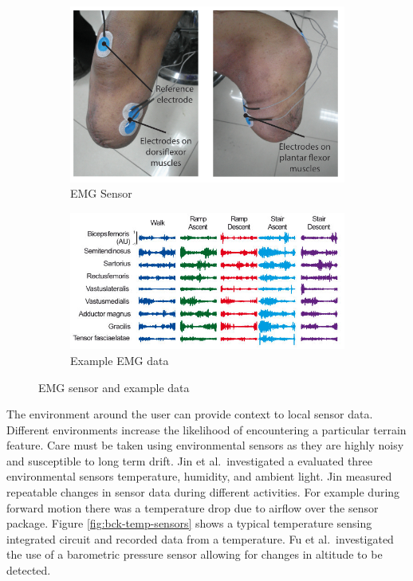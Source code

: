\begin{figure}[!hbt]
    \centering
    \centering
    \begin{subfigure}[b]{0.44\textwidth}
        \centering
        \includegraphics[width=\textwidth]{content/2-Background/sensors/EMG-Amputee_Sensor.png}
        \caption{EMG Sensor\cite{Chen2016}}
    \end{subfigure}
    \hfill
    \begin{subfigure}[b]{0.54\textwidth}
        \centering
        \includegraphics[width=\textwidth]{content/2-Background/sensors/EMG_Sensor_Data.jpg}
        \caption{Example EMG data\cite{Hargrove2015}}
    \end{subfigure}
    \caption{EMG sensor and example data}
    \label{fig:bck-emg-sensors}
\end{figure}

The environment around the user can provide context to local sensor data. Different environments increase the likelihood of encountering a particular terrain feature\cite{Tucker2015, Tschiedel2020}. Care must be taken using environmental sensors as they are highly noisy and susceptible to long term drift. Jin et al.~investigated a evaluated three environmental sensors temperature, humidity, and ambient light. Jin measured repeatable changes in sensor data during different activities. For example during forward motion there was a temperature drop due to airflow over the sensor package.\cite{Jin2014} Figure \ref{fig:bck-temp-sensors} shows a typical temperature sensing integrated circuit and recorded data from a temperature. Fu et al.~investigated the use of a barometric pressure sensor allowing for changes in altitude to be detected\cite{Fu2021}.

